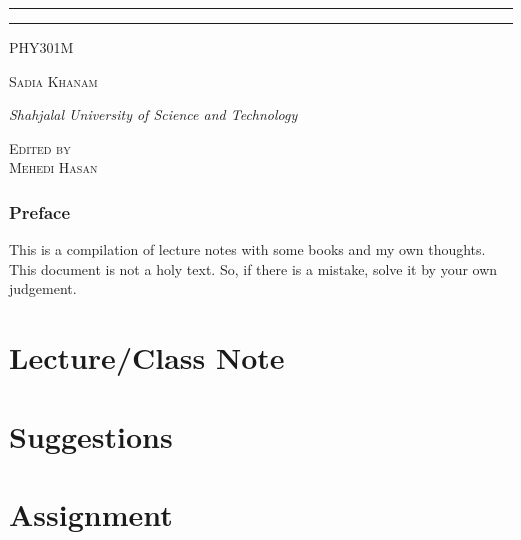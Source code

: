 \documentclass[12pt]{book}
\newcommand{\course}{PHY301M}
\newcommand{\prof}{Sadia Khanam}
\begin{document}
\begin{titlepage}
\rule{345pt}{0.4pt}\vspace*{-\baselineskip}\vspace{3.2pt}
\rule{345pt}{1.6pt}

\vspace{2\baselineskip}

{\scshape \Large{\course}} 

\vspace*{5\baselineskip}



\vspace{0.5\baselineskip} 

{\scshape   \Large \prof\\ }

\vspace{0.75\baselineskip} 

{\textit{\large Shahjalal University of Science and Technology}} 

\vfill 

\vspace{0.3\baselineskip} 


{\scshape \large Edited by\\  Mehedi Hasan} 
\vspace*{40pt}
\end{titlepage}
\newpage
\section*{Preface}
This is a compilation of lecture notes with some books and my own thoughts. This document is not a holy text. So, if there is a mistake, solve it by your own judgement.

\newpage
\tableofcontents
\newpage
{}
\part{Lecture/Class Note}
\begingroup





\endgroup
\part{Suggestions}

\part{Assignment}

\end{document}
